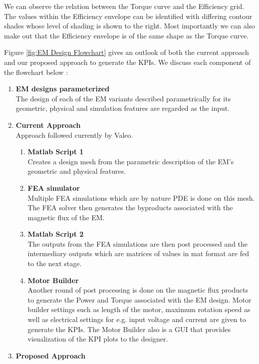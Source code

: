 \documentclass{report} %
\begin{document}
We can observe the relation between the Torque curve and the Efficiency grid. 
The values within the Efficiency envelope can be identified with differing contour shades whose level of shading is shown to the right.
Most importantly we can also make out that the Efficiency envelope is of the same shape as the Torque curve.

Figure \ref{fig:EM Design Flowchart} gives an outlook of both the current approach and our proposed approach to generate the \ac{KPI}s.
We discuss each component of the flowchart below :
\begin{enumerate}
    \item \textbf{\ac{EM} designs parameterized} \\
    The design of each of the \ac{EM} variants described parametrically for its geometric, physical and simulation features are regarded as the input.
    \item \textbf{Current Approach}\\
    Approach followed currently by Valeo.
    \begin{enumerate}
        \item \textbf{Matlab Script 1} \\
        Creates a design mesh from the parametric description of the \ac{EM}'s geometric and physical features.
        \item \textbf{\ac{FEA} simulator} \\
        Multiple \ac{FEA} simulations which are by nature \ac{PDE} is done on this mesh. The \ac{FEA} solver then 
        generates the byproducts associated with the magnetic flux of the \ac{EM}.
        \item \textbf{Matlab Script 2} \\
        The outputs from the \ac{FEA} simulations are then post processed and the intermediary outputs which are matrices of values in mat format are fed to the next stage.
        \item \textbf{Motor Builder} \\
        Another round of post processing is done on the magnetic flux products to generate the Power and Torque associated with the \ac{EM} design.
        Motor builder settings such as length of the motor, maximum rotation speed as well as electrical settings for e.g. input voltage and current are given to 
        generate the \ac{KPI}s. The Motor Builder also is a GUI that provides visualization of the \ac{KPI} plots to the designer.
    \end{enumerate}
    \item \textbf{Proposed Approach}\\

\end{enumerate}
\end{document}
